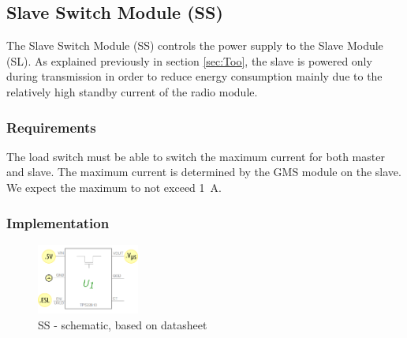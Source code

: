 \subsection{Slave Switch Module (SS)}
\label{sec:SS}


The Slave Switch Module (SS) controls the power supply to the Slave Module (SL).
As explained previously in section \ref{sec:Too}, the slave is powered only during transmission in order
to reduce energy consumption mainly due to the relatively high standby current of the radio module.

\subsubsection*{Requirements}


The load switch must be able to switch the maximum current for both master and slave.
The maximum current is determined by the GMS module on the slave.
We expect the maximum to not exceed \SI{1}{\A}.

\subsubsection*{Implementation}


\begin{figure}[h]
    \centering
    \includegraphics[width=0.3\textwidth]{MA/SS/SS}
    \caption{SS - schematic, based on datasheet \cite{noauthor_tps22810_2016}}
\end{figure}









